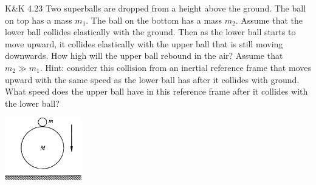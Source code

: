 \documentclass{esg8012pset}
\begin{document}
\begin{problem}{K\&K 4.23}
  Two superballs are dropped from a height above the ground. The ball on top has a mass $m_1$. The ball on the bottom has a mass $m_2$. Assume that the lower ball collides elastically with the ground. Then as the lower ball starts to move upward, it collides elastically with the upper ball that is still moving downwards. How high will the upper ball rebound in the air? Assume that $m_2 \gg m_1$. Hint: consider this collision from an inertial reference frame that moves upward with the same speed as the lower ball has after it collides with ground. What speed does the upper ball have in this reference frame after it collides with the lower ball?
  \begin{center}\includegraphics[width=0.25\textwidth]{ps07_2}\end{center}
\end{problem}
\end{document}
